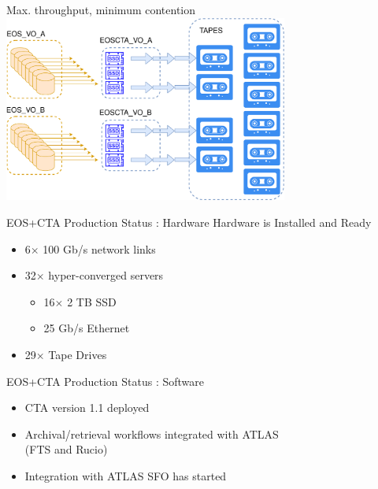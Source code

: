 \documentclass[aspectratio=1610]{beamer}
\begin{document}
\begin{frame}{Max. throughput, minimum contention}
  \centering
  \includegraphics[width=0.7\textwidth]{images/upload_e764d94a4ee3ac79c328ea0d21a6a128.pdf}
\end{frame}

\begin{frame}{EOS+CTA Production Status : Hardware}
   {\LARGE\color{cern@blue}Hardware is Installed and Ready}
   \begin{itemize}
      \item 6$\times$ 100 Gb/s network links
      \item 32$\times$ hyper-converged servers
      \begin{itemize}
         \item 16$\times$ 2 TB SSD
         \item 25 Gb/s Ethernet
      \end{itemize}
      \item 29$\times$ Tape Drives
   \end{itemize}
\end{frame}

\begin{frame}{EOS+CTA Production Status : Software}
   \begin{itemize}
      \item CTA version 1.1 deployed
      \item Archival/retrieval workflows integrated with ATLAS\\
         (FTS and Rucio)
      \item Integration with ATLAS SFO has started
   \end{itemize}
\end{frame}
\end{document}

